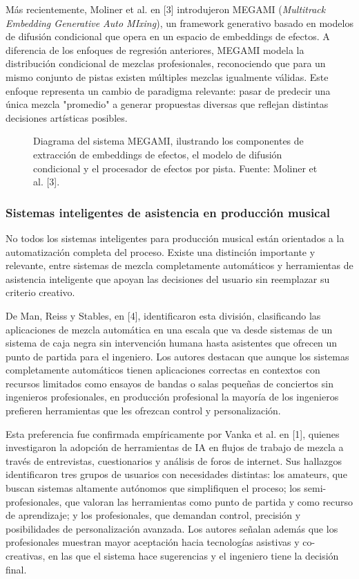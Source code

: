 \documentclass[12pt]{article}
\begin{document}
Más recientemente, Moliner et al. en [3] introdujeron MEGAMI (\textit{Multitrack Embedding Generative Auto MIxing}), un framework generativo basado en modelos de difusión condicional que opera en un espacio de embeddings de efectos. A diferencia de los enfoques de regresión anteriores, MEGAMI modela la distribución condicional de mezclas profesionales, reconociendo que para un mismo conjunto de pistas existen múltiples mezclas igualmente válidas. Este enfoque representa un cambio de paradigma relevante: pasar de predecir una única mezcla "promedio" a generar propuestas diversas que reflejan distintas decisiones artísticas posibles.

\begin{figure}[h!]
\centering
\caption{Diagrama del sistema MEGAMI, ilustrando los componentes de extracción de embeddings de efectos, el modelo de difusión condicional y el procesador de efectos por pista. Fuente: Moliner et al. [3].}
\label{fig:fig4}
\end{figure}

\subsubsection*{Sistemas inteligentes de asistencia en producción musical}

No todos los sistemas inteligentes para producción musical están orientados a la automatización completa del proceso. Existe una distinción importante y relevante, entre sistemas de mezcla completamente automáticos y herramientas de asistencia inteligente que apoyan las decisiones del usuario sin reemplazar su criterio creativo.

De Man, Reiss y Stables, en [4], identificaron esta división, clasificando las aplicaciones de mezcla automática en una escala que va desde sistemas de un sistema de caja negra sin intervención humana hasta asistentes que ofrecen un punto de partida para el ingeniero. Los autores destacan que aunque los sistemas completamente automáticos tienen aplicaciones correctas en contextos con recursos limitados como ensayos de bandas o salas pequeñas de conciertos sin ingenieros profesionales, en producción profesional la mayoría de los ingenieros prefieren herramientas que les ofrezcan control y personalización.

Esta preferencia fue confirmada empíricamente por Vanka et al. en [1], quienes investigaron la adopción de herramientas de IA en flujos de trabajo de mezcla a través de entrevistas, cuestionarios y análisis de foros de internet. Sus hallazgos identificaron tres grupos de usuarios con necesidades distintas: los amateurs, que buscan sistemas altamente autónomos que simplifiquen el proceso; los semi-profesionales, que valoran las herramientas como punto de partida y como recurso de aprendizaje; y los profesionales, que demandan control, precisión y posibilidades de personalización avanzada. Los autores señalan además que los profesionales muestran mayor aceptación hacia tecnologías asistivas y co-creativas, en las que el sistema hace sugerencias y el ingeniero tiene la decisión final.
\end{document}
